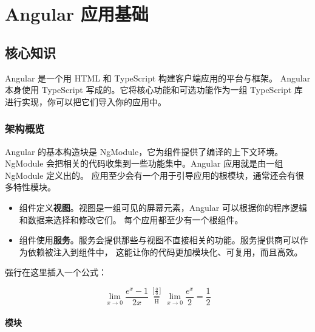 \documentclass{progbookcn}
\begin{document}


\thispagestyle{empty}


\frontmatter






\clearpage
{
  \hypersetup{hidelinks}
  \tableofcontents
}


\mainmatter

\part{Angular 应用基础}


\chapter{核心知识}

Angular 是一个用 HTML 和 TypeScript 构建客户端应用的平台与框架。 Angular 本身使用 TypeScript 写成的。它将核心功能和可选功能作为一组 TypeScript 库进行实现，你可以把它们导入你的应用中。


\section{架构概览}

Angular 的基本构造块是 NgModule，它为组件提供了编译的上下文环境。 NgModule 会把相关的代码收集到一些功能集中。Angular 应用就是由一组 NgModule 定义出的。 应用至少会有一个用于引导应用的根模块，通常还会有很多特性模块。

\begin{itemize}
  \item 组件定义\textbf{视图}。视图是一组可见的屏幕元素，Angular 可以根据你的程序逻辑和数据来选择和修改它们。 每个应用都至少有一个根组件。
  \item 组件使用\textbf{服务}。服务会提供那些与视图不直接相关的功能。服务提供商可以作为依赖被注入到组件中， 这能让你的代码更加模块化、可复用，而且高效。
\end{itemize}

强行在这里插入一个公式：

\begin{equation}
  \label{eq:1}
   \lim_{x\to 0}{\frac{e^x-1}{2x}}
   \overset{\left[\frac{0}{0}\right]}{\underset{\mathrm{H}}{=}}
   \lim_{x\to 0}{\frac{e^x}{2}}={\frac{1}{2}}
\end{equation}


\subsection{模块}
\end{document}
